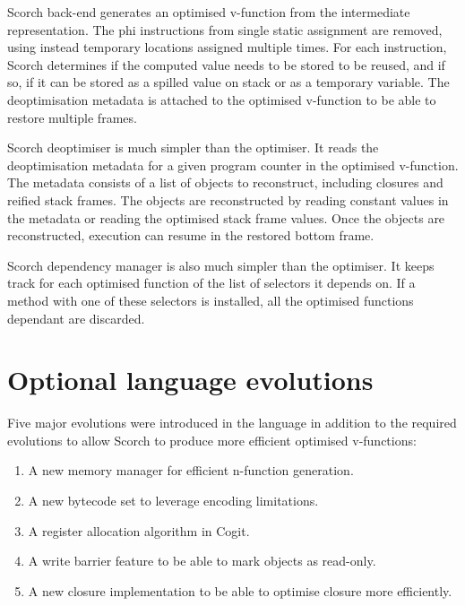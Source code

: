 \documentclass[a4paper,12pt,twoside]{../includes/ThesisStyle}
\begin{document}
Scorch back-end generates an optimised v-function from the intermediate representation. The phi instructions from single static assignment are removed, using instead temporary locations assigned multiple times. For each instruction, Scorch determines if the computed value needs to be stored to be reused, and if so, if it can be stored as a spilled value on stack or as a temporary variable. The deoptimisation metadata is attached to the optimised v-function to be able to restore multiple frames.

Scorch deoptimiser is much simpler than the optimiser. It reads the deoptimisation metadata for a given program counter in the optimised v-function. The metadata consists of a list of objects to reconstruct, including closures and reified stack frames. The objects are reconstructed by reading constant values in the metadata or reading the optimised stack frame values. Once the objects are reconstructed, execution can resume in the restored bottom frame.

Scorch dependency manager is also much simpler than the optimiser. It keeps track for each optimised function of the list of selectors it depends on. If a method with one of these selectors is installed, all the optimised functions dependant are discarded. 


\section{Optional language evolutions}
\label{sec:OptLangEvol}

Five major evolutions were introduced in the language in addition to the required evolutions to allow Scorch to produce more efficient optimised v-functions:
\begin{enumerate}
	\item A new memory manager for efficient n-function generation.
	\item A new bytecode set to leverage encoding limitations.
	\item A register allocation algorithm in Cogit.
	\item A write barrier feature to be able to mark objects as read-only.
	\item A new closure implementation to be able to optimise closure more efficiently.
\end{enumerate}
\end{document}
